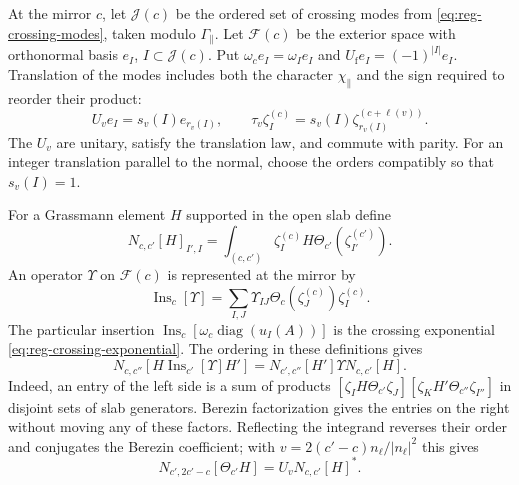 \documentclass[11pt,letterpaper,reqno]{amsart}
\DeclareMathOperator{\diag}{diag}
\begin{document}
At the mirror $c$, let $\mathcal J(c)$ be the ordered set of crossing
modes from \eqref{eq:reg-crossing-modes}, taken modulo
$\Gamma_\parallel$. Let $\mathcal F(c)$ be the exterior space with
orthonormal basis $e_I$, $I\subset\mathcal J(c)$. Put
$\omega_c e_I=\omega_Ie_I$ and $U_{\mathrm f}e_I=(-1)^{|I|}e_I$.
Translation of the modes includes both the character
$\chi_\parallel$ and the sign required to reorder their product:
\[
 U_ve_I=s_v(I)e_{r_v(I)},\qquad
 \tau_v\zeta_I^{(c)}=s_v(I)\zeta_{r_v(I)}^{(c+\ell(v))}.
\]
The $U_v$ are unitary, satisfy the translation law, and commute with
parity. For an integer translation parallel to the normal, choose the
orders compatibly so that $s_v(I)=1$.

For a Grassmann element $H$ supported in the open slab define
\begin{equation}\label{eq:slab-fermion-matrix}
 N_{c,c'}[H]_{I',I}
    =\int_{(c,c')}\zeta_I^{(c)}H
                        \Theta_{c'}(\zeta_{I'}^{(c')}).
\end{equation}
An operator $\Upsilon$ on $\mathcal F(c)$ is represented at the
mirror by
\[
 \operatorname{Ins}_c[\Upsilon]
       =\sum_{I,J}\Upsilon_{IJ}\Theta_c(\zeta_J^{(c)})\zeta_I^{(c)}.
\]
The particular insertion
$\operatorname{Ins}_c[\omega_c\diag(u_I(A))]$ is the crossing
exponential \eqref{eq:reg-crossing-exponential}. The ordering in these
definitions gives
\begin{equation}\label{eq:slab-matrix-composition}
 N_{c,c''}[H\operatorname{Ins}_{c'}[\Upsilon]H']
             =N_{c',c''}[H']\Upsilon N_{c,c'}[H].
\end{equation}
Indeed, an entry of the left side is a sum of products
$[\zeta_IH\Theta_{c'}\zeta_J]
 [\zeta_KH'\Theta_{c''}\zeta_{I''}]$ in disjoint sets of slab
generators. Berezin factorization gives the entries on the right
without moving any of these factors. Reflecting the integrand reverses
their order and conjugates the Berezin coefficient; with
$v=2(c'-c)n_\ell/|n_\ell|^2$ this gives
\begin{equation}\label{eq:slab-matrix-adjoint}
 N_{c',2c'-c}[\Theta_{c'}H]=U_vN_{c,c'}[H]^*.
\end{equation}
\end{document}
